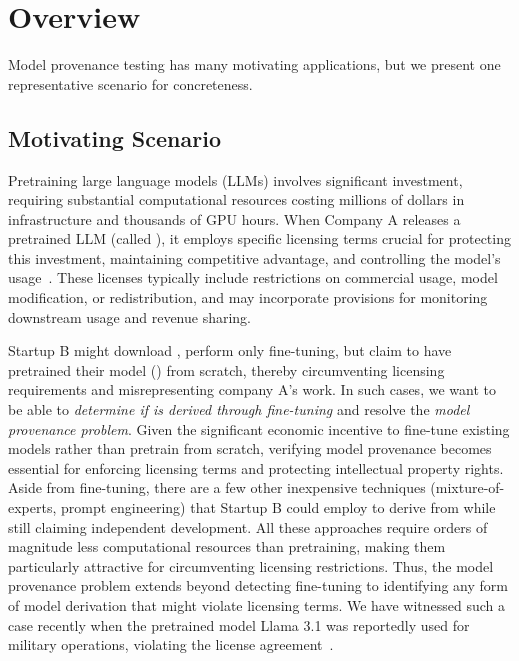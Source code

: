 \section{Overview}
\label{sec:problem}

Model provenance testing has many motivating applications, but we present one representative scenario for concreteness.

\subsection{Motivating Scenario}
\label{sec:motivation}

%
Pretraining large language models (LLMs) involves significant investment, requiring substantial computational resources costing millions of dollars in infrastructure and thousands of GPU hours. When Company A releases a pretrained LLM (called \llmp), it employs specific licensing terms crucial for protecting this investment, maintaining competitive advantage, and controlling the model's usage~\cite{chatgpt-api,anil2023palm}. These licenses typically include restrictions on commercial usage, model modification, or redistribution, and may incorporate provisions for monitoring downstream usage and revenue sharing.

Startup B might download \llmp, perform only fine-tuning, but claim to have pretrained their model (\llmf) from scratch, thereby circumventing licensing requirements and misrepresenting company A's work. In such cases, we want to be able to \emph{determine if \llmf is derived through fine-tuning \llmp} and resolve the \emph{model provenance problem}. Given the significant economic incentive to fine-tune existing models rather than pretrain from scratch, verifying model provenance becomes essential for enforcing licensing terms and protecting intellectual property rights.
%
Aside from fine-tuning, there are a few 
other inexpensive techniques (mixture-of-experts, prompt engineering) that Startup B could employ to derive \llmf from \llmp while still claiming independent development. 
%
All these approaches require orders of magnitude less computational resources than pretraining, making them particularly attractive for circumventing licensing restrictions. Thus, the model provenance problem extends beyond detecting fine-tuning to identifying any form of model derivation that might violate licensing terms.
We have witnessed such a case recently when the pretrained model Llama 3.1 was reportedly used for military operations, violating the license agreement~\cite{china2024llm}. 

